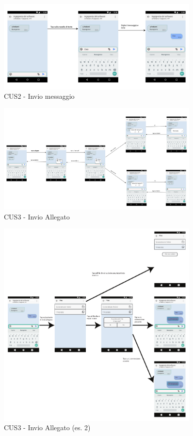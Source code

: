 \begin{figure}
	\centering
	\includegraphics[width=0.9\textwidth]{imgs/gruppo6/activities/act_cus2_invio_messaggio.pdf}
	\caption{CUS2 - Invio messaggio}
	\label{fig:act-cus2}
\end{figure}

\begin{figure}
	\centering
	\includegraphics[width=0.9\textwidth]{imgs/gruppo6/activities/act_cus3_invia_allegato.pdf}
	\caption{CUS3 - Invio Allegato}
	\label{fig:act-cus3-1}
\end{figure}

\begin{figure}
	\centering
	\includegraphics[width=0.9\textwidth]{imgs/gruppo6/activities/act_cus3_invio_allegato2.pdf}
	\caption{CUS3 - Invio Allegato (es. 2)}
	\label{fig:act-cus3-2}
\end{figure}

